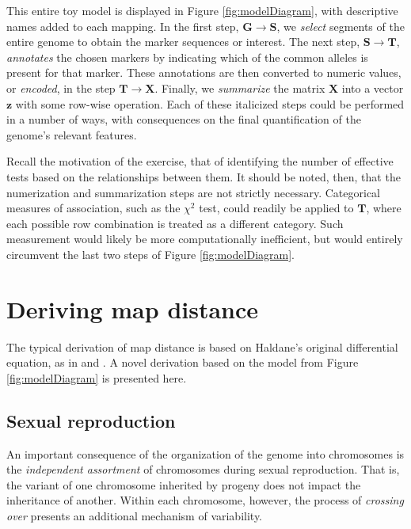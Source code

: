 \documentclass{article}
\newcommand{\ve}[1]{\mathbf{#1}}           %
\newcommand{\m}[1]{\mathbf{#1}}               %
\begin{document}
This entire toy model is displayed in Figure \ref{fig:modelDiagram}, with descriptive names added to each mapping. In the first step, $\m{G} \rightarrow \m{S}$, we \textit{select} segments of the entire genome to obtain the marker sequences or interest. The next step, $\m{S} \rightarrow \m{T}$, \textit{annotates} the chosen markers by indicating which of the common alleles is present for that marker. These annotations are then converted to numeric values, or \textit{encoded}, in the step $\m{T} \rightarrow \m{X}$. Finally, we \textit{summarize} the matrix $\m{X}$ into a vector $\ve{z}$ with some row-wise operation. Each of these italicized steps could be performed in a number of ways, with consequences on the final quantification of the genome's relevant features.

Recall the motivation of the exercise, that of identifying the number of effective tests based on the relationships between them. It should be noted, then, that the numerization and summarization steps are not strictly necessary. Categorical measures of association, such as the $\chi^2$ test, could readily be applied to $\m{T}$, where each possible row combination is treated as a different category. Such measurement would likely be more computationally inefficient, but would entirely circumvent the last two steps of Figure \ref{fig:modelDiagram}. 

\section{Deriving map distance} \label{sec:derivingDists}

The typical derivation of map distance is based on Haldane's original differential equation, as in \cite{kosambi1943estimation} and \cite{xu2013principles}. A novel derivation based on the model from Figure \ref{fig:modelDiagram} is presented here.

\subsection{Sexual reproduction} \label{subsec:crossingover}

An important consequence of the organization of the genome into chromosomes is the \textit{independent assortment} of chromosomes during sexual reproduction. That is, the variant of one chromosome inherited by progeny does not impact the inheritance of another. Within each chromosome, however, the process of \textit{crossing over} presents an additional mechanism of variability.
\end{document}
